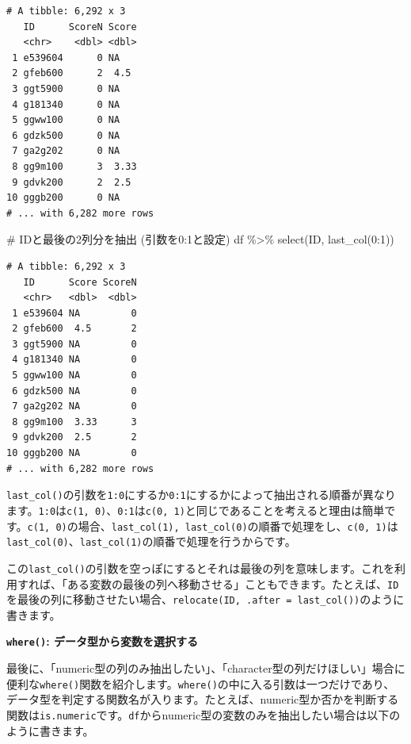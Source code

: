 \documentclass[
  a4paper,
  pandoc,
  ja=standard,
  jafont=haranoaji]{bxjsbook}
\newenvironment{Shaded}{\begin{snugshade}}{\end{snugshade}}
\newcommand{\CommentTok}[1]{\textcolor[rgb]{0.37,0.37,0.37}{#1}}
\newcommand{\DecValTok}[1]{\textcolor[rgb]{0.68,0.00,0.00}{#1}}
\newcommand{\FunctionTok}[1]{\textcolor[rgb]{0.28,0.35,0.67}{#1}}
\newcommand{\NormalTok}[1]{\textcolor[rgb]{0.00,0.48,0.65}{#1}}
\newcommand{\SpecialCharTok}[1]{\textcolor[rgb]{0.37,0.37,0.37}{#1}}
\begin{document}
\begin{verbatim}
# A tibble: 6,292 x 3
   ID      ScoreN Score
   <chr>    <dbl> <dbl>
 1 e539604      0 NA   
 2 gfeb600      2  4.5 
 3 ggt5900      0 NA   
 4 g181340      0 NA   
 5 ggww100      0 NA   
 6 gdzk500      0 NA   
 7 ga2g202      0 NA   
 8 gg9m100      3  3.33
 9 gdvk200      2  2.5 
10 gggb200      0 NA   
# ... with 6,282 more rows
\end{verbatim}

\begin{Shaded}
\begin{Highlighting}[numbers=left,,]
\CommentTok{\# IDと最後の2列分を抽出 (引数を0:1と設定)}
\NormalTok{df }\SpecialCharTok{\%\textgreater{}\%}
  \FunctionTok{select}\NormalTok{(ID, }\FunctionTok{last\_col}\NormalTok{(}\DecValTok{0}\SpecialCharTok{:}\DecValTok{1}\NormalTok{))}
\end{Highlighting}
\end{Shaded}

\begin{verbatim}
# A tibble: 6,292 x 3
   ID      Score ScoreN
   <chr>   <dbl>  <dbl>
 1 e539604 NA         0
 2 gfeb600  4.5       2
 3 ggt5900 NA         0
 4 g181340 NA         0
 5 ggww100 NA         0
 6 gdzk500 NA         0
 7 ga2g202 NA         0
 8 gg9m100  3.33      3
 9 gdvk200  2.5       2
10 gggb200 NA         0
# ... with 6,282 more rows
\end{verbatim}

\texttt{last\_col()}の引数を\texttt{1:0}にするか\texttt{0:1}にするかによって抽出される順番が異なります。\texttt{1:0}は\texttt{c(1,\ 0)}、\texttt{0:1}は\texttt{c(0,\ 1)}と同じであることを考えると理由は簡単です。\texttt{c(1,\ 0)}の場合、\texttt{last\_col(1),\ last\_col(0)}の順番で処理をし、\texttt{c(0,\ 1)}は\texttt{last\_col(0)}、\texttt{last\_col(1)}の順番で処理を行うからです。

この\texttt{last\_col()}の引数を空っぽにするとそれは最後の列を意味します。これを利用すれば、「ある変数の最後の列へ移動させる」こともできます。たとえば、\texttt{ID}を最後の列に移動させたい場合、\texttt{relocate(ID,\ .after\ =\ last\_col())}のように書きます。

\textbf{\texttt{where()}: データ型から変数を選択する}

最後に、「numeric型の列のみ抽出したい」、「character型の列だけほしい」場合に便利な\texttt{where()}関数を紹介します。\texttt{where()}の中に入る引数は一つだけであり、データ型を判定する関数名が入ります。たとえば、numeric型か否かを判断する関数は\texttt{is.numeric}です。\texttt{df}からnumeric型の変数のみを抽出したい場合は以下のように書きます。
\end{document}
